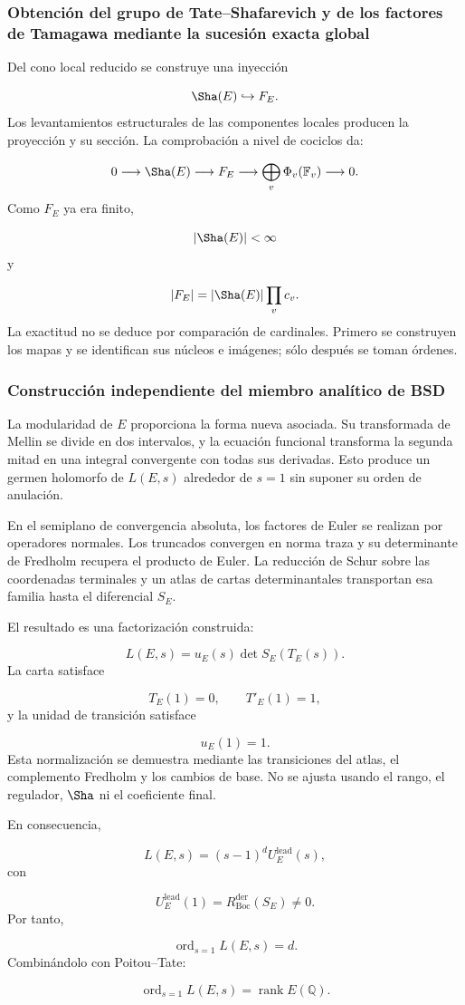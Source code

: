 \subsubsection{Obtención del grupo de Tate–Shafarevich y de los factores de Tamagawa mediante la sucesión exacta global}
Del cono local reducido se construye una inyección\par
\[
\Sha(E)\hookrightarrow F_E.
\]
Los levantamientos estructurales de las componentes locales producen la proyección y su sección. La comprobación a nivel de cociclos da:\par
\[
0
\longrightarrow
\Sha(E)
\longrightarrow
F_E
\longrightarrow
\bigoplus_v\Phi_v(\mathbb F_v)
\longrightarrow
0.
\]
Como \(F_E\) ya era finito,\par
\[
|\Sha(E)|<\infty
\]
y\par
\[
|F_E|
=
|\Sha(E)|
\prod_v c_v.
\]
La exactitud no se deduce por comparación de cardinales. Primero se construyen los mapas y se identifican sus núcleos e imágenes; sólo después se toman órdenes.\par
{}
\subsubsection{Construcción independiente del miembro analítico de BSD}
La modularidad de \(E\) proporciona la forma nueva asociada. Su transformada de Mellin se divide en dos intervalos, y la ecuación funcional transforma la segunda mitad en una integral convergente con todas sus derivadas. Esto produce un germen holomorfo de \(L(E,s)\) alrededor de \(s=1\) sin suponer su orden de anulación.\par
En el semiplano de convergencia absoluta, los factores de Euler se realizan por operadores normales. Los truncados convergen en norma traza y su determinante de Fredholm recupera el producto de Euler. La reducción de Schur sobre las coordenadas terminales y un atlas de cartas determinantales transportan esa familia hasta el diferencial \(S_E\).\par
El resultado es una factorización construida:\par
\[
L(E,s)
=
u_E(s)
\det S_E(T_E(s)).
\]
La carta satisface\par
\[
T_E(1)=0,
\qquad
T'_E(1)=1,
\]
y la unidad de transición satisface\par
\[
u_E(1)=1.
\]
Esta normalización se demuestra mediante las transiciones del atlas, el complemento Fredholm y los cambios de base. No se ajusta usando el rango, el regulador, \(\Sha\) ni el coeficiente final.\par
En consecuencia,\par
\[
L(E,s)
=
(s-1)^dU_E^{\mathrm{lead}}(s),
\]
con\par
\[
U_E^{\mathrm{lead}}(1)
=
R_{\mathrm{Boc}}^{\mathrm{der}}(S_E)
\neq0.
\]
Por tanto,\par
\[
\operatorname{ord}_{s=1}L(E,s)=d.
\]
Combinándolo con Poitou–Tate:\par
\[
\operatorname{ord}_{s=1}L(E,s)
=
\operatorname{rank}E(\mathbb Q).
\]
